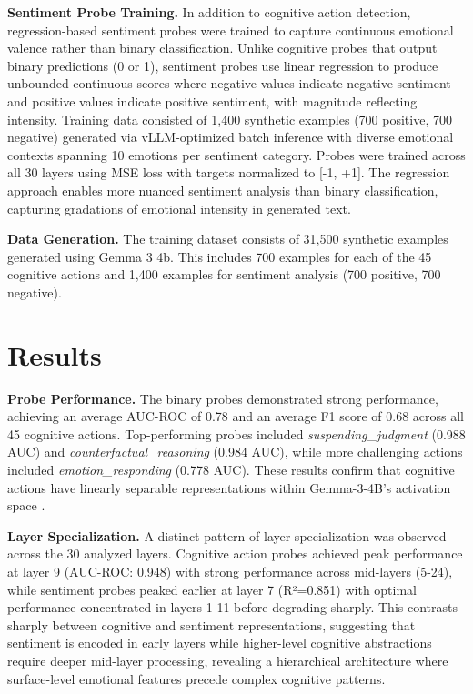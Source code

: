 \documentclass[letterpaper]{article}
\begin{document}
\textbf{Sentiment Probe Training.} In addition to cognitive action detection, regression-based sentiment probes were trained to capture continuous emotional valence rather than binary classification. Unlike cognitive probes that output binary predictions (0 or 1), sentiment probes use linear regression to produce unbounded continuous scores where negative values indicate negative sentiment and positive values indicate positive sentiment, with magnitude reflecting intensity. Training data consisted of 1,400 synthetic examples (700 positive, 700 negative) generated via vLLM-optimized batch inference with diverse emotional contexts spanning 10 emotions per sentiment category. Probes were trained across all 30 layers using MSE loss with targets normalized to [-1, +1]. The regression approach enables more nuanced sentiment analysis than binary classification, capturing gradations of emotional intensity in generated text.

\textbf{Data Generation.} The training dataset consists of 31,500 synthetic examples generated using Gemma 3 4b. This includes 700 examples for each of the 45 cognitive actions and 1,400 examples for sentiment analysis (700 positive, 700 negative).

\section{Results}

\textbf{Probe Performance.} The binary probes demonstrated strong performance, achieving an average AUC-ROC of 0.78 and an average F1 score of 0.68 across all 45 cognitive actions. Top-performing probes included \textit{suspending\_judgment} (0.988 AUC) and \textit{counterfactual\_reasoning} (0.984 AUC), while more challenging actions included \textit{emotion\_responding} (0.778 AUC). These results confirm that cognitive actions have linearly separable representations within Gemma-3-4B's activation space \cite{alain2016understanding}.

\textbf{Layer Specialization.} A distinct pattern of layer specialization was observed across the 30 analyzed layers. Cognitive action probes achieved peak performance at layer 9 (AUC-ROC: 0.948) with strong performance across mid-layers (5-24), while sentiment probes peaked earlier at layer 7 (R²=0.851) with optimal performance concentrated in layers 1-11 before degrading sharply. This contrasts sharply between cognitive and sentiment representations, suggesting that sentiment is encoded in early layers while higher-level cognitive abstractions require deeper mid-layer processing, revealing a hierarchical architecture where surface-level emotional features precede complex cognitive patterns.
\end{document}
